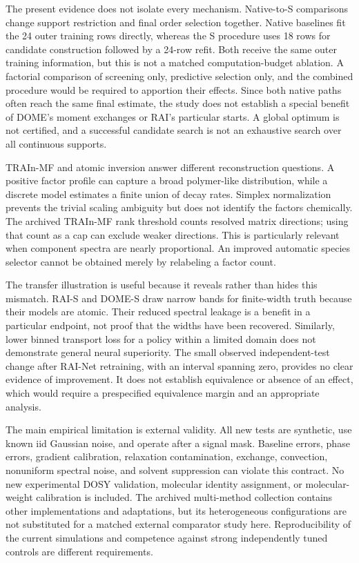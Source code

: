 The present evidence does not isolate every mechanism. Native-to-S comparisons change support restriction and final order selection together. Native baselines fit the 24 outer training rows directly, whereas the S procedure uses 18 rows for candidate construction followed by a 24-row refit. Both receive the same outer training information, but this is not a matched computation-budget ablation. A factorial comparison of screening only, predictive selection only, and the combined procedure would be required to apportion their effects. Since both native paths often reach the same final estimate, the study does not establish a special benefit of DOME's moment exchanges or RAI's particular starts. A global optimum is not certified, and a successful candidate search is not an exhaustive search over all continuous supports.

TRAIn-MF and atomic inversion answer different reconstruction questions. A positive factor profile can capture a broad polymer-like distribution, while a discrete model estimates a finite union of decay rates. Simplex normalization prevents the trivial scaling ambiguity but does not identify the factors chemically. The archived TRAIn-MF rank threshold counts resolved matrix directions; using that count as a cap can exclude weaker directions. This is particularly relevant when component spectra are nearly proportional. An improved automatic species selector cannot be obtained merely by relabeling a factor count.

The transfer illustration is useful because it reveals rather than hides this mismatch. RAI-S and DOME-S draw narrow bands for finite-width truth because their models are atomic. Their reduced spectral leakage is a benefit in a particular endpoint, not proof that the widths have been recovered. Similarly, lower binned transport loss for a policy within a limited domain does not demonstrate general neural superiority. The small observed independent-test change after RAI-Net retraining, with an interval spanning zero, provides no clear evidence of improvement. It does not establish equivalence or absence of an effect, which would require a prespecified equivalence margin and an appropriate analysis.

The main empirical limitation is external validity. All new tests are synthetic, use known iid Gaussian noise, and operate after a signal mask. Baseline errors, phase errors, gradient calibration, relaxation contamination, exchange, convection, nonuniform spectral noise, and solvent suppression can violate this contract. No new experimental DOSY validation, molecular identity assignment, or molecular-weight calibration is included. The archived multi-method collection contains other implementations and adaptations, but its heterogeneous configurations are not substituted for a matched external comparator study here. Reproducibility of the current simulations and competence against strong independently tuned controls are different requirements.

